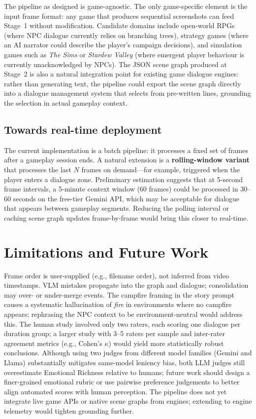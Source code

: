 \documentclass[11pt]{article}
\begin{document}
The pipeline as designed is game-agnostic. The only game-specific element is the input frame format: any game that produces sequential screenshots can feed Stage~1 without modification. Candidate domains include open-world RPGs (where NPC dialogue currently relies on branching trees), strategy games (where an AI narrator could describe the player's campaign decisions), and simulation games such as \emph{The Sims} or \emph{Stardew Valley} (where emergent player behaviour is currently unacknowledged by NPCs). The JSON scene graph produced at Stage~2 is also a natural integration point for existing game dialogue engines: rather than generating text, the pipeline could export the scene graph directly into a dialogue management system that selects from pre-written lines, grounding the selection in actual gameplay context.

\subsection{Towards real-time deployment}

The current implementation is a batch pipeline: it processes a fixed set of frames after a gameplay session ends. A natural extension is a \textbf{rolling-window variant} that processes the last $N$ frames on demand---for example, triggered when the player enters a dialogue zone. Preliminary estimation suggests that at 5-second frame intervals, a 5-minute context window (60 frames) could be processed in 30--60 seconds on the free-tier Gemini API, which may be acceptable for dialogue that appears between gameplay segments. Reducing the polling interval or caching scene graph updates frame-by-frame would bring this closer to real-time.

\section{Limitations and Future Work}

Frame order is user-supplied (e.g., filename order), not inferred from video timestamps. VLM mistakes propagate into the graph and dialogue; consolidation may over- or under-merge events. The campfire framing in the story prompt causes a systematic hallucination of \emph{fire} in environments where no campfire appears; rephrasing the NPC context to be environment-neutral would address this. The human study involved only two raters, each scoring one dialogue per duration group; a larger study with 3--5 raters per sample and inter-rater agreement metrics (e.g., Cohen's $\kappa$) would yield more statistically robust conclusions. Although using two judges from different model families (Gemini and Llama) substantially mitigates same-model leniency bias, both LLM judges still overestimate Emotional Richness relative to humans; future work should design a finer-grained emotional rubric or use pairwise preference judgements to better align automated scores with human perception. The pipeline does not yet integrate live game APIs or native scene graphs from engines; extending to engine telemetry would tighten grounding further.



\end{document}
